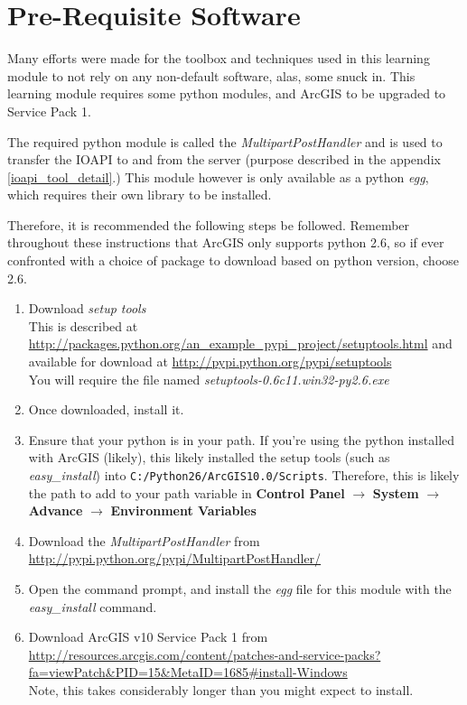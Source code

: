 \section{Pre-Requisite Software}
\label{prereq}

Many efforts were made for the toolbox and techniques used in this learning
module to not rely on any non-default software, alas, some snuck in.
This learning module requires some python modules, and ArcGIS to be
upgraded to Service Pack 1.

The required python module is called the \emph{MultipartPostHandler} and is
used to transfer the IOAPI to and from the server (purpose described
in the appendix \ref{ioapi_tool_detail}.)  This module however is only
available as a python \emph{egg}, which requires their own library to
be installed.

Therefore, it is recommended the following steps be followed.
Remember throughout these instructions that ArcGIS only supports
python 2.6, so if ever confronted with a choice of package to download
based on python version, choose 2.6.
\begin{enumerate}
	\item Download \emph{setup tools} \\
	This is described at
\url{http://packages.python.org/an\_example\_pypi\_project/setuptools.html}
and available for download at
\url{http://pypi.python.org/pypi/setuptools} \\
	You will require the file named
\emph{setuptools-0.6c11.win32-py2.6.exe}
	\item Once downloaded, install it.
	\item Ensure that your python is in your path.  If you're using
the python installed with ArcGIS (likely), this likely installed the
setup tools (such as \emph{easy\_install}) into
\texttt{C:/Python26/ArcGIS10.0/Scripts}.  Therefore, this is likely
the path to add to your path variable in \textbf{Control Panel}
$\rightarrow$ \textbf{System} $\rightarrow$ \textbf{Advance}
$\rightarrow$ \textbf{Environment Variables}
	\item Download the \emph{MultipartPostHandler} from
\url{http://pypi.python.org/pypi/MultipartPostHandler/}
	\item Open the command prompt, and install the \emph{egg} file for
this module with the \emph{easy\_install} command.
	\item Download ArcGIS v10 Service Pack 1 from
\url{http://resources.arcgis.com/content/patches-and-service-packs?fa=viewPatch\&PID=15\&MetaID=1685#install-Windows}
\\
	Note, this takes considerably longer than you might expect to
install.
\end{enumerate}

